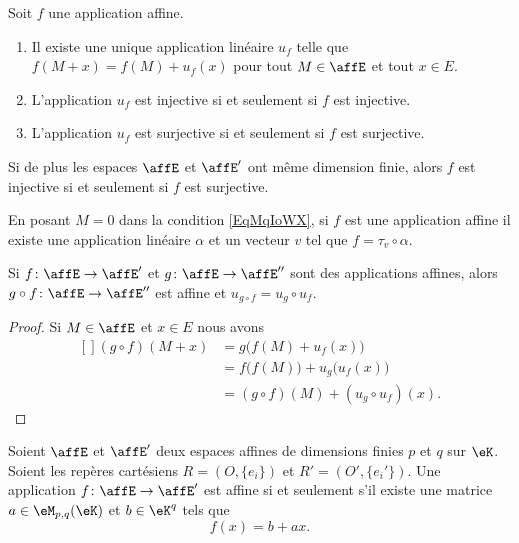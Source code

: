 \begin{proposition}     \label{PROPooALXYooHoMdqQ}
    Soit \( f\) une application affine.
    \begin{enumerate}
        \item       \label{ITEMooSKCYooHyRZYN}
            Il existe une unique application linéaire \( u_f\) telle que \( f(M+x)=f(M)+u_f(x)\) pour tout \( M\in \affE\) et tout \( x\in E\).
        \item
            L'application \( u_f\) est injective si et seulement si \( f\) est injective.
        \item
            L'application \( u_f\) est surjective si et seulement si \( f\) est surjective.
    \end{enumerate}
    Si de plus les espaces \( \affE\) et \( \affE'\) ont même dimension finie, alors \( f\) est injective si et seulement si \( f\) est surjective.
\end{proposition}

\begin{normaltext}  \label{NORMooMWEEooOTUQNB}
En posant \( M=0\) dans la condition \eqref{EqMqIoWX}, si \( f\) est une application affine il existe une application linéaire \( \alpha\) et un vecteur \( v\) tel que \( f=\tau_v\circ \alpha\).
\end{normaltext}



\begin{proposition}
    Si \( f\colon \affE\to \affE'\) et \( g\colon \affE\to \affE''\) sont des applications affines, alors \( g\circ f\colon \affE\to \affE''\) est affine et \( u_{g\circ f}=u_g\circ u_f\).
\end{proposition}

\begin{proof}
    Si \( M\in\affE\) et \( x\in E\) nous avons
    \begin{equation}
        \begin{aligned}[]
            (g\circ f)(M+x)&=g\big( f(M)+u_f(x) \big)\\
            &=f\big( f(M) \big)+u_g\big( u_f(x) \big)\\
            &=(g\circ f)(M)+(u_g\circ u_f)(x).
        \end{aligned}
    \end{equation}
\end{proof}

\begin{theorem}
    Soient \( \affE\) et \( \affE'\) deux espaces affines de dimensions finies \( p\) et \( q\) sur \( \eK\). Soient les repères cartésiens \( R=(O,\{ e_i \})\) et \( R'=(O',\{ e_i' \})\). Une application \( f\colon \affE\to \affE'\) est affine si et seulement s'il existe une matrice \( a\in\eM_{p,q}(\eK)\) et \( b\in \eK^q\) tels que
    \begin{equation}    \label{EqCmNHjs}
        f(x)=b+ax.
    \end{equation}
\end{theorem}

